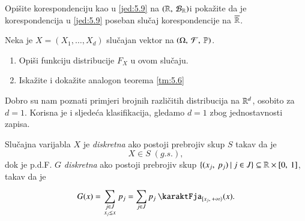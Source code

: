 \begin{zad} \label{zad:5.10}
    Opi\v site korespondenciju kao u \eqref{jed:5.9} na $({\mathbb{R}}, \: {\mathcal{B}_{\mathbb{R}}})$i poka\v zite da je korespondencija u \eqref{jed:5.9} poseban slu\v caj korespondencije na $\overline{\mathbb{R}}$.
\end{zad}

\begin{zad} \label{zad:5.11}
    Neka je $X = (X_1, \ldots, X_d)$ slu\v cajan vektor na $(\Omega, \: \mathcal{F}, \: \mathbb{P})$.
    \begin{enumerate}[label=(\alph*)]
        \item Opi\v si funkciju distribucije $F_X$ u ovom slu\v caju.
        \item Iska\v zite i doka\v zite analogon teorema \ref{tm:5.6}
    \end{enumerate}
\end{zad}

Dobro su nam poznati primjeri brojnih razli\v citih distribucija na $\mathbb{R}^d$, osobito za $d = 1$.
Korisna je i sljede\' ca klasifikacija, gledamo $d = 1$ zbog jednostavnosti zapisa.

\begin{defn}    \label{defn:5.11-1}
    Slu\v cajna varijabla $X$ je \emph{diskretna} ako postoji prebrojiv skup $S$ takav da je
    \begin{equation*}
        X \in S \; (g.s.),
    \end{equation*}
    dok je p.d.F. $G$ \emph{diskretna} ako postoji prebrojiv skup $\{{({x_j}, \: {p_j})} \: | \: {j \in J}\} \subseteq \mathbb{R} \times [{0}, \:{1}]$, takav da je
    \begin{equation*}
        G(x) = \suma{
            \begin{smallmatrix}
                j \in J\\
                x_j \leq x
            \end{smallmatrix}
            }{} p_j = \suma{j \in J}{} p_j \: \karaktFja_{\desInt{x_j}{+\infty}} (x).
    \end{equation*}
\end{defn}

